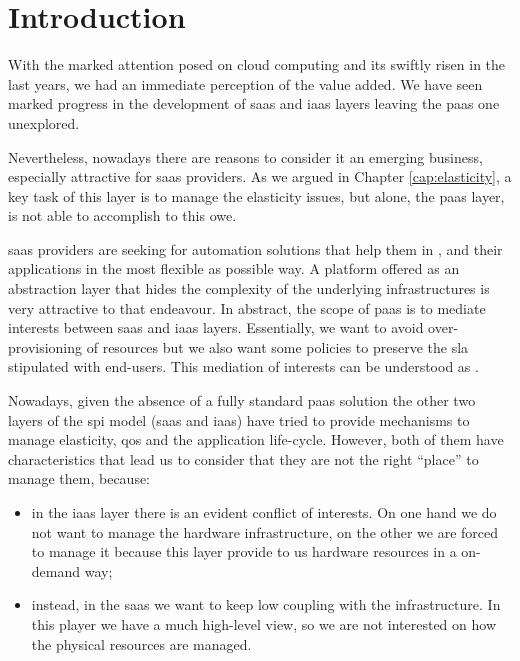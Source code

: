 %
%
\section{Introduction}
\label{sec:elasticity-introduction}
With the marked attention posed on cloud computing and its swiftly risen in the last years, we had
an immediate perception of the value added. We have seen marked progress in the development of
\ac{saas} and \ac{iaas} layers leaving the \ac{paas} one unexplored.

Nevertheless, nowadays there are reasons to consider it an emerging business, especially attractive
for \ac{saas} providers. As we argued in Chapter \ref{cap:elasticity}, a key task of this layer is
to manage the elasticity issues, but alone, the \ac{paas} layer, is not able to accomplish to this owe.

\ac{saas} providers are seeking for automation solutions that help them in ,
 and  their applications in the most flexible as possible way. A
platform offered as an abstraction layer that hides the complexity of the underlying infrastructures
is very attractive to that endeavour. In abstract, the scope of \ac{paas} is to mediate interests
between \ac{saas} and \ac{iaas} layers. Essentially, we want to avoid over-provisioning of resources
but we also want some policies to preserve the \ac{sla} stipulated with end-users. This mediation
of interests can be understood as .

Nowadays, given the absence of a fully standard \ac{paas} solution the other two layers of the \ac{spi}
model (\ac{saas} and \ac{iaas}) have tried to provide mechanisms to manage elasticity, \ac{qos} and the
application life-cycle. However, both of them have characteristics that lead us to consider that they are
not the right ``place'' to manage them, because:

\begin{itemize}
	\item{in the \ac{iaas} layer there is an evident conflict of interests. On one hand we do not want
		to manage the hardware infrastructure, on the other we are forced to manage it because this layer
		provide to us hardware resources in a on-demand way;}
	\item{instead, in the \ac{saas} we want to keep low coupling with the infrastructure. In this player
		we have a much high-level view, so we are not interested on how the physical resources
		are managed.}
\end{itemize}

